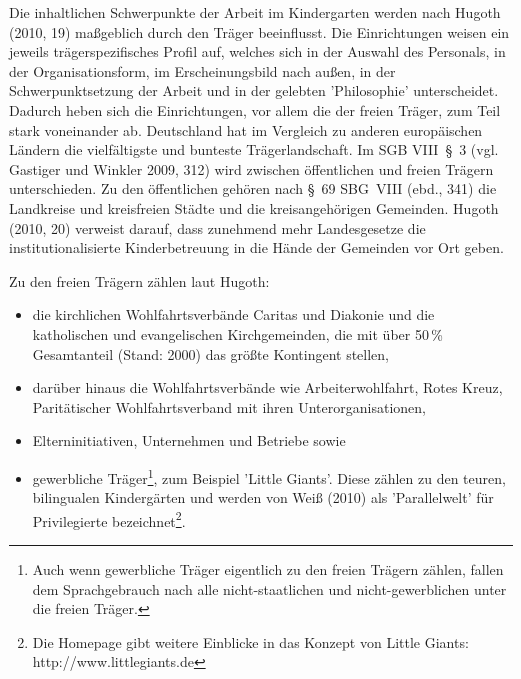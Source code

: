 Die inhaltlichen Schwerpunkte der Arbeit im Kindergarten werden nach Hugoth (2010, 19) maßgeblich durch den Träger beeinflusst. Die Einrichtungen weisen ein jeweils trägerspezifisches Profil auf, welches sich in der Auswahl des Personals, in der Organisationsform, im Erscheinungsbild nach außen, in der Schwerpunktsetzung der Arbeit und in der gelebten 'Philosophie' unterscheidet. Dadurch heben sich die Einrichtungen, vor allem die der freien Träger, zum Teil stark voneinander ab. Deutschland hat im Vergleich zu anderen europäischen Ländern die vielfältigste und bunteste Trägerlandschaft. 
Im SGB VIII~§~3 (vgl. Gastiger und Winkler 2009, 312) wird zwischen öffentlichen und freien Trägern unterschieden. Zu den öffentlichen gehören nach §~69 SBG~VIII (ebd., 341) die Landkreise und kreisfreien Städte und die kreisangehörigen Gemeinden. Hugoth (2010, 20) verweist darauf, dass zunehmend mehr Landesgesetze die institutionalisierte Kinderbetreuung in die Hände der Gemeinden vor Ort geben. 

Zu den freien Trägern zählen laut Hugoth: 
\begin{itemize}
\item die kirchlichen Wohlfahrtsverbände Caritas und Diakonie und die katholischen und evangelischen Kirchgemeinden, die mit über 50\,\%
Gesamtanteil (Stand: 2000) das größte Kontingent stellen, 
\item darüber hinaus die Wohlfahrtsverbände wie Arbeiterwohlfahrt, Rotes Kreuz, Paritätischer Wohlfahrtsverband mit ihren Unterorganisationen,
\item Elterninitiativen, Unternehmen und Betriebe sowie
\item gewerbliche Träger\footnote{Auch wenn gewerbliche Träger eigentlich zu den freien Trägern zählen, fallen dem Sprachgebrauch nach alle nicht-staatlichen und nicht-gewerblichen unter die freien Träger.}, zum Beispiel 'Little Giants'. Diese zählen zu den teuren, bilingualen Kindergärten und werden von Weiß (2010) als 'Parallelwelt' für Privilegierte bezeichnet\footnote{Die Homepage gibt weitere Einblicke in das Konzept von Little Giants: http://www.littlegiants.de}.      
\end{itemize}


